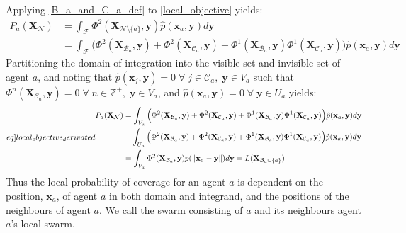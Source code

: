 Applying \eqref{B_a_and_C_a_def} to \eqref{local_objective} yields:
\begin{equation}
  \begin{split}
    P_{a}(\mathbf{X}_{\mathcal{N}}) &= \int_{\mathcal{F}}\Phi^{2}(\mathbf{X}_{\mathcal{N}\setminus\{a\}}, \mathbf{y})\hat{p}(\mathbf{x}_{a}, \mathbf{y})d\mathbf{y}\\
    &= \int_{\mathcal{F}}\Big(\Phi^{2}(\mathbf{X}_{\mathcal{B}_{a}}, \mathbf{y}) + \Phi^{2}(\mathbf{X}_{\mathcal{C}_{a}}, \mathbf{y}) + \Phi^{1}(\mathbf{X}_{\mathcal{B}_{a}}, \mathbf{y})\Phi^{1}(\mathbf{X}_{\mathcal{C}_{a}}, \mathbf{y})\Big)\hat{p}(\mathbf{x}_{a}, \mathbf{y})d\mathbf{y}
  \end{split}
\end{equation}
Partitioning the domain of integration into the visible set and invisible set of agent $a$, and noting that $\hat{p}(\mathbf{x}_{j}, \mathbf{y}) = 0\;\forall\;j\in\mathcal{C}_{a},\;\mathbf{y}\in V_{a}$ such that
$\Phi^{n}(\mathbf{X}_{\mathcal{C}_{a}}, \mathbf{y}) = 0\;\forall\;n\in\mathbb{Z}^{+},\;\mathbf{y}\in V_{a}$, and $\hat{p}(\mathbf{x}_{a}, \mathbf{y}) = 0\;\forall\;\mathbf{y}\in U_{a}$ yields:
\begin{equation}\label[eq]{local_objective_derivated}
  \begin{split}
    P_{a}(\mathbf{X}_{\mathcal{N}}) &= \int_{V_{a}}\Big(\Phi^{2}(\mathbf{X}_{\mathcal{B}_{a}}, \mathbf{y}) + \Phi^{2}(\mathbf{X}_{\mathcal{C}_{a}}, \mathbf{y}) + \Phi^{1}(\mathbf{X}_{\mathcal{B}_{a}}, \mathbf{y})\Phi^{1}(\mathbf{X}_{\mathcal{C}_{a}}, \mathbf{y})\Big)\hat{p}(\mathbf{x}_{a}, \mathbf{y})d\mathbf{y}\\
    &+ \int_{U_{a}}\Big(\Phi^{2}(\mathbf{X}_{\mathcal{B}_{a}}, \mathbf{y}) + \Phi^{2}(\mathbf{X}_{\mathcal{C}_{a}}, \mathbf{y}) + \Phi^{1}(\mathbf{X}_{\mathcal{B}_{a}}, \mathbf{y})\Phi^{1}(\mathbf{X}_{\mathcal{C}_{a}}, \mathbf{y})\Big)\hat{p}(\mathbf{x}_{a}, \mathbf{y})d\mathbf{y}\\
    &= \int_{V_{a}}\Phi^{2}(\mathbf{X}_{\mathcal{B}_{a}}, \mathbf{y})p(\norm{\mathbf{x}_{a}-\mathbf{y}})d\mathbf{y} = L(\mathbf{X}_{\mathcal{B}_{a}\cup\{a\}})
  \end{split}
\end{equation}
Thus the local probability of coverage for an agent $a$ is dependent on the position, $\mathbf{x}_{a}$, of agent $a$ in both domain and integrand, and the positions of the neighbours of agent $a$.
We call the swarm consisting of $a$ and its neighbours agent $a$'s local swarm.\clearpage

